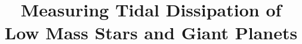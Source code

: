 \rhead{\thepage}

\lfoot{}

\cfoot{}

\rfoot{}

\setlength{\defaultparfillskip}{\parfillskip}

\setlength{\defaultparindent}{\parindent}




\title{\vspace{-20mm}Measuring Tidal Dissipation of Low Mass Stars and Giant Planets}
\date{}
